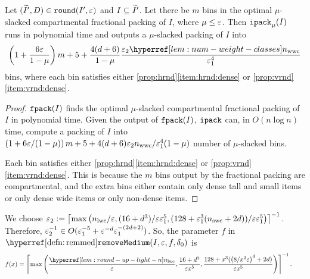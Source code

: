 \begin{theorem}
\label{thm:ipack}
Let $(\widetilde{I}', D) \in \operatorname{\mathtt{round}}(I', \varepsilon)$ and $I \subseteq \widetilde{I}'$.
Let there be $m$ bins in the optimal $\mu$-slacked compartmental fractional packing of $I$,
where $\mu \le \varepsilon$. Then $\operatorname{\mathtt{ipack}}_{\mu}(I)$ runs in polynomial time and outputs
a $\mu$-slacked packing of $I$ into
\[ \left( 1 + \frac{6\eps}{1-\mu}\right)m + 5
    + \frac{4(d+6)}{1-\mu} \frac{\epsSmall\nwwcHyp}{\epsLarge^4} \]
bins, where each bin satisfies either \cref{prop:hrnd}\ref{item:hrnd:dense}
or \cref{prop:vrnd}\ref{item:vrnd:dense}.
\end{theorem}
\begin{proof}
$\operatorname{\mathtt{fpack}}(I)$ finds the optimal $\mu$-slacked compartmental fractional packing
of $I$ in polynomial time. Given the output of $\operatorname{\mathtt{fpack}}(I)$, $\operatorname{\mathtt{ipack}}$ can, in $O(n\log n)$ time,
compute a packing of $I$ into
$\left( 1 + 6\varepsilon/(1-\mu)\right)m + 5
+ 4(d+6)\varepsilon_2 n_{\mathrm{wwc}}/\varepsilon_1^4(1-\mu)$ number of $\mu$-slacked bins.

Each bin satisfies either \cref{prop:hrnd}\ref{item:hrnd:dense}
or \cref{prop:vrnd}\ref{item:vrnd:dense}.
This is because the $m$ bins output by the fractional packing are compartmental,
and the extra bins either contain only dense tall and small items or
only dense wide items or only non-dense items.
\end{proof}

We choose
$\varepsilon_2 := \left\lceil \max\left(n_{\mathrm{lwc}}/\varepsilon, (16 + d^3)/\varepsilon\varepsilon_1^5,
    (128 + \varepsilon_1^3(n_{\mathrm{swc}} + 2d))/\varepsilon\varepsilon_1^5\right) \right\rceil^{-1}$.
Therefore,
$\varepsilon_2^{-1} \in O(\varepsilon_1^{-5} + \varepsilon^{-d}\varepsilon_1^{-(2d+2)})$.
So, the parameter $f$ in $\remMedHyp(I, \eps, f, \delta_0)$ is
\begin{equation} \label{eqn:remmed-f} f(x) = \ceil{\max\left(
    \frac{\nlwcHyp}{\eps}, \frac{16 + d^3}{\eps x^5},
    \frac{128 + x^3(\left(8/x^2\eps\right)^d + 2d)}{\eps x^5}\right)}^{-1}.
    \tag*{}
\end{equation}

